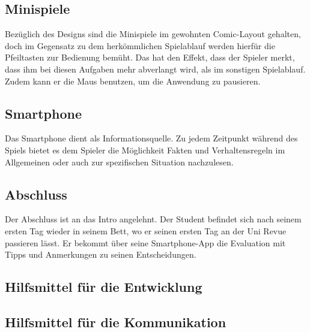 \documentclass[a4paper, 11pt]{article} %
\begin{document}
\subsection{Minispiele}
Bezüglich des Designs sind die Minispiele im gewohnten Comic-Layout gehalten, doch im Gegensatz zu dem herkömmlichen Spielablauf werden hierfür die Pfeiltasten zur Bedienung bemüht. Das hat den Effekt, dass der Spieler merkt, dass ihm bei diesen Aufgaben mehr abverlangt wird, als im sonstigen Spielablauf. Zudem kann er die Maus benutzen, um die Anwendung zu pausieren.

\subsection{Smartphone}
Das Smartphone dient als Informationsquelle. Zu jedem Zeitpunkt während des Spiels bietet es dem Spieler die Möglichkeit Fakten und Verhaltensregeln im Allgemeinen oder auch zur spezifischen Situation nachzulesen.

\subsection{Abschluss}
Der Abschluss ist an das Intro angelehnt. Der Student befindet sich nach seinem ersten Tag wieder in seinem Bett, wo er seinen ersten Tag an der Uni Revue passieren lässt. Er bekommt über seine Smartphone-App die Evaluation mit Tipps und Anmerkungen zu seinen Entscheidungen. 

\subsection{Hilfsmittel für die Entwicklung}

\subsection{Hilfsmittel für die Kommunikation}
\end{document}
